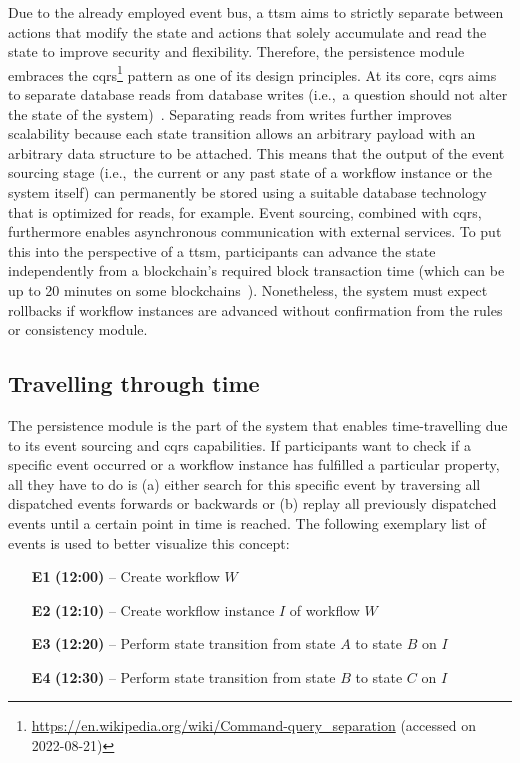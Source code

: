 Due to the already employed event bus, a \gls{ttsm} aims to strictly separate between actions that modify the state and actions that solely accumulate and read the state to improve security and flexibility. Therefore, the persistence module embraces the \gls{cqrs}\footnote{\url{https://en.wikipedia.org/wiki/Command-query_separation} (accessed on 2022-08-21)} pattern as one of its design principles. At its core, \gls{cqrs} aims to separate database reads from database writes (i.e.,\ a question should not alter the state of the system)~\cite{meyer1988_effeil_and_cqs}. Separating reads from writes further improves scalability because each state transition allows an arbitrary payload with an arbitrary data structure to be attached. This means that the output of the event sourcing stage (i.e.,\ the current or any past state of a workflow instance or the system itself) can permanently be stored using a suitable database technology that is optimized for reads, for example. Event sourcing, combined with \gls{cqrs}, furthermore enables asynchronous communication with external services. To put this into the perspective of a \gls{ttsm}, participants can advance the state independently from a blockchain's required block transaction time (which can be up to 20 minutes on some blockchains~\cite{nakamoto2009}). Nonetheless, the system must expect rollbacks if workflow instances are advanced without confirmation from the rules or consistency module.


\subsection{Travelling through time}
\label{sec:ttsm:proposal:travelling_through_time}
The persistence module is the part of the system that enables time-travelling due to its event sourcing and \gls{cqrs} capabilities. If participants want to check if a specific event occurred or a workflow instance has fulfilled a particular property, all they have to do is (a) either search for this specific event by traversing all dispatched events forwards or backwards or (b) replay all previously dispatched events until a certain point in time is reached. The following exemplary list of events is used to better visualize this concept:

\begin{enumerate}
    \item[\textbf{E1}] \textbf{(12:00)} -- Create workflow $W$
    \item[\textbf{E2}] \textbf{(12:10)} -- Create workflow instance $I$ of workflow $W$
    \item[\textbf{E3}] \textbf{(12:20)} -- Perform state transition from state $A$ to state $B$ on $I$
    \item[\textbf{E4}] \textbf{(12:30)} -- Perform state transition from state $B$ to state $C$ on $I$
\end{enumerate}

